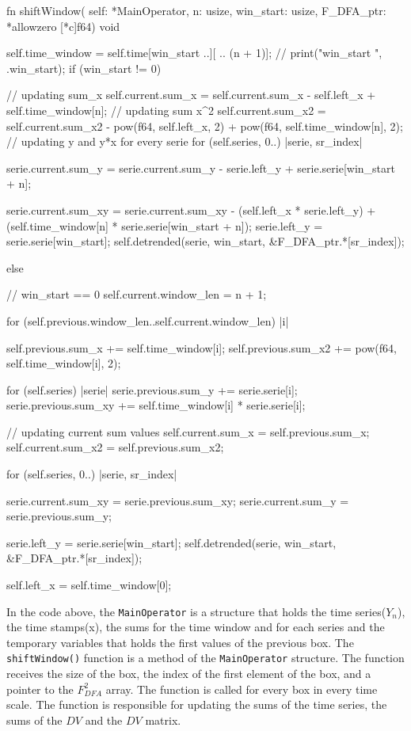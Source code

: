 \documentclass[article]{jss}
\begin{document}
\begin{Code}

fn shiftWindow( self: *MainOperator,
                n: usize, win_start: usize,
                F_DFA_ptr: *allowzero [*c]f64) void {
    self.time_window = self.time[win_start ..][ .. (n + 1)];
    // print("win_start {}\n", .{win_start});
    if (win_start != 0) {
        // updating sum_x
        self.current.sum_x = self.current.sum_x - self.left_x + self.time_window[n];
        // updating sum x^2
        self.current.sum_x2 = self.current.sum_x2 - 
        pow(f64, self.left_x, 2) + pow(f64, self.time_window[n], 2);
        // updating y and y*x for every serie
        for (self.series, 0..) |serie, sr_index| {
            serie.current.sum_y = serie.current.sum_y - 
            serie.left_y + serie.serie[win_start + n];

            serie.current.sum_xy = serie.current.sum_xy - 
            (self.left_x * serie.left_y) + 
            (self.time_window[n] * serie.serie[win_start + n]);
            serie.left_y = serie.serie[win_start];
            self.detrended(serie, win_start, &F_DFA_ptr.*[sr_index]);
        }
    } else { // win_start == 0
        self.current.window_len = n + 1;

        for (self.previous.window_len..self.current.window_len) |i| {
            self.previous.sum_x += self.time_window[i];
            self.previous.sum_x2 += pow(f64, self.time_window[i], 2);

            for (self.series) |serie| {
                serie.previous.sum_y += serie.serie[i];
                serie.previous.sum_xy += self.time_window[i] * serie.serie[i];
            }
        }

        // updating current sum values
        self.current.sum_x = self.previous.sum_x;
        self.current.sum_x2 = self.previous.sum_x2;

        for (self.series, 0..) |serie, sr_index| {
            serie.current.sum_xy = serie.previous.sum_xy;
            serie.current.sum_y = serie.previous.sum_y;

            serie.left_y = serie.serie[win_start];
            self.detrended(serie, win_start, &F_DFA_ptr.*[sr_index]);
        }
    }
    self.left_x = self.time_window[0];
}
\end{Code}
In the code above, the \verb"MainOperator" is a structure that holds the time series($Y_n$), the time stamps(x), the sums for the time window and for each series and the temporary variables that holds the first values of the previous box. The \verb"shiftWindow()" function is a method of the \verb"MainOperator" structure. The function receives the size of the box, the index of the first element of the box, and a pointer to the $F_{DFA}^{2}$ array. The function is called for every box in every time scale. The function is responsible for updating the sums of the time series, the sums of the $DV$ and the $DV$ matrix.
\end{document}

